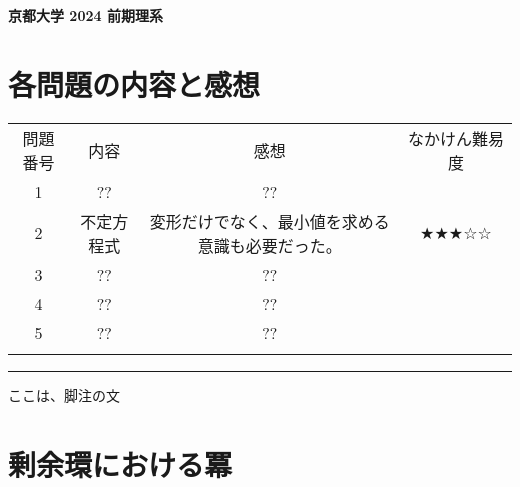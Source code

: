 \documentclass[11pt]{article}
\begin{document}
\begin{center}
{\LARGE \textbf{京都大学 2024 前期理系}}
\end{center}
\vspace{2mm}

\section*{各問題の内容と感想}

\renewcommand{\arraystretch}{1.3} %
\begin{tabular}{!{\vrule width 1pt}c!{\vrule width 1pt}c!{\vrule width 1pt}c!{\vrule width 1pt}c!{\vrule width 1pt}}
\Xhline{1pt}
 問題番号 & 内容 & 感想 & なかけん難易度\\
\Xhline{1pt} %
1 & ?? & ?? & \\
\Xhline{1pt}
2 & 不定方程式 & 変形だけでなく、最小値を求める意識も必要だった。 & ★★★☆☆\\
\Xhline{1pt}
3 & ?? & ?? & \\
\Xhline{1pt}
4 & ?? & ?? & \\
\Xhline{1pt}
5 & ?? & ?? & \\
\Xhline{1pt}
\end{tabular}

\vspace{1cm}


\vfill
\hrule
\vspace{1mm}
{\footnotesize ここは、脚注の文}

\newpage

\section{剰余環における冪}
\end{document}
